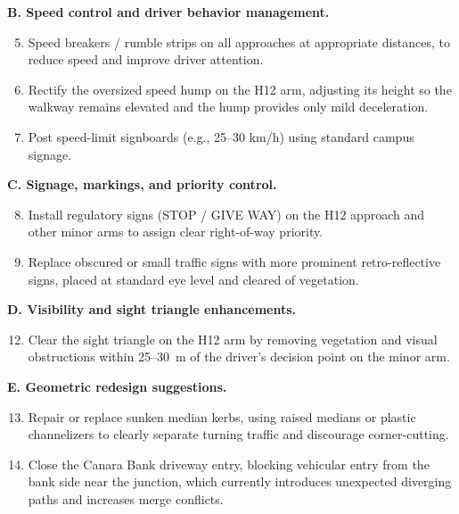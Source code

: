 \documentclass[11pt]{article}
\begin{document}
\textbf{B. Speed control and driver behavior management.}
\begin{enumerate}
  \setcounter{enumi}{4}
  \item Speed breakers / rumble strips on all approaches at appropriate distances, to reduce speed and
  improve driver attention.
  \item Rectify the oversized speed hump on the H12 arm, adjusting its height so the walkway remains
  elevated and the hump provides only mild deceleration.
  \item Post speed-limit signboards (e.g., 25--30 km/h) using standard campus signage.
\end{enumerate}

\textbf{C. Signage, markings, and priority control.}
\begin{enumerate}
  \setcounter{enumi}{7}
  \item Install regulatory signs (STOP / GIVE WAY) on the H12 approach and other minor arms to assign
  clear right-of-way priority.
  \item Replace obscured or small traffic signs with more prominent retro-reflective signs, placed at
  standard eye level and cleared of vegetation.
\end{enumerate}

\textbf{D. Visibility and sight triangle enhancements.}
\begin{enumerate}
  \setcounter{enumi}{11}
  \item Clear the sight triangle on the H12 arm by removing vegetation and visual obstructions within
  25--30~m of the driver's decision point on the minor arm.
\end{enumerate}

\textbf{E. Geometric redesign suggestions.}
\begin{enumerate}
  \setcounter{enumi}{12}
  \item Repair or replace sunken median kerbs, using raised medians or plastic channelizers to clearly
  separate turning traffic and discourage corner-cutting.
  \item Close the Canara Bank driveway entry, blocking vehicular entry from the bank side near the
  junction, which currently introduces unexpected diverging paths and increases merge conflicts.
\end{enumerate}
\end{document}
